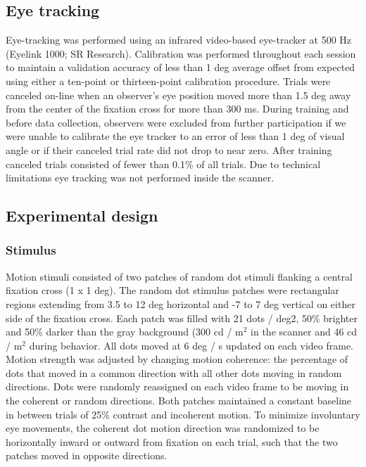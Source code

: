\subsection{Eye tracking}

Eye-tracking was performed using an infrared video-based eye-tracker at 500 Hz (Eyelink 1000; SR Research). Calibration was performed throughout each session to maintain a validation accuracy of less than 1 deg average offset from expected using either a ten-point or thirteen-point calibration procedure. Trials were canceled on-line when an observer’s eye position moved more than 1.5 deg away from the center of the fixation cross for more than 300 ms. During training and before data collection, observers were excluded from further participation if we were unable to calibrate the eye tracker to an error of less than 1 deg of visual angle or if their canceled trial rate did not drop to near zero. After training canceled trials consisted of fewer than 0.1\% of all trials. Due to technical limitations eye tracking was not performed inside the scanner. 

\subsection{Experimental design}

\subsubsection{Stimulus}

Motion stimuli consisted of two patches of random dot stimuli flanking a central fixation cross (1 x 1 deg). The random dot stimulus patches were rectangular regions extending from 3.5 to 12 deg horizontal and -7 to 7 deg vertical on either side of the fixation cross. Each patch was filled with 21 dots / deg2, 50\% brighter and 50\% darker than the gray background (300 cd / m$^2$ in the scanner and 46 cd / m$^2$ during behavior. All dots moved at 6 deg / s updated on each video frame. Motion strength was adjusted by changing motion coherence: the percentage of dots that moved in a common direction with all other dots moving in random directions. Dots were randomly reassigned on each video frame to be moving in the coherent or random directions. Both patches maintained a constant baseline in between trials of 25\% contrast and incoherent motion. To minimize involuntary eye movements, the coherent dot motion direction was randomized to be horizontally inward or outward from fixation on each trial, such that the two patches moved in opposite directions. 
